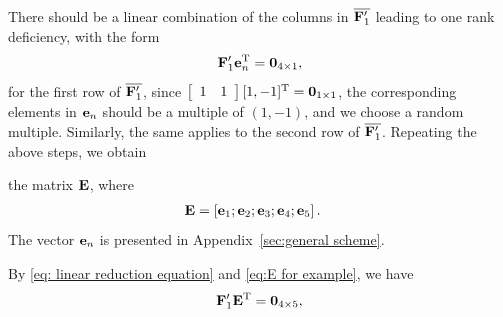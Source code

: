 \documentclass[conference,letterpaper]{IEEEtran}
\begin{document}
\begin{example}
There should be a linear combination of the columns in $\overline{{\bf F}^{\prime}_1}$ leading to one rank deficiency, with the form
\begin{align}
 {\bf F}'_1 {\bf e}_n^{\text{\rm T}} = {\bf 0}_{4 \times 1},
 \label{eq: linear reduction equation}
\end{align}
for the first row of $\overline{{\bf F}^{\prime}_1}$, since $\left[ {\begin{array}{cc} 1 & 1 \\ \end{array}} \right] [1, -1]^{\text{\rm T}} = {\bf 0}_{1 \times 1}$, the corresponding elements in ${\bf e}_n$ should be a multiple of $(1, -1)$, and we choose a random multiple. Similarly, the same applies to the second row of $\overline{{\bf F}^{\prime}_1}$. Repeating the above steps, we obtain

the matrix ${\bf E}$, where
\begin{align}
{\bf E} &= 
\left[ {\bf e}_1 ;  {\bf e}_2 ;  {\bf e}_3 ;  {\bf e}_4 ; {\bf e}_5  \right] .
\label{eq:E for example}
\end{align}
The vector \({\bf e}_n\) is presented in Appendix~\ref{sec:general scheme}.

By \eqref{eq: linear reduction equation} and \eqref{eq:E for example}, we have
\begin{align}
{\bf F}'_1 {\bf E}^{\text{\rm T}} = \mathbf{0}_{4\times 5}, 
\label{eq:equations for example}
\end{align}


\end{example}
\end{document}
